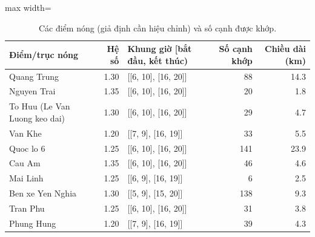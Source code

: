 \begin{table}[!htbp]
\centering
\small
\caption{Các điểm nóng (giả định cần hiệu chỉnh) và số cạnh được khớp.}
\label{tab:tab_hotspots}
\begin{adjustbox}{max width=\linewidth}
\begin{tabular}{lrlrr}
\toprule
Điểm/trục nóng & Hệ số & Khung giờ [bắt đầu, kết thúc) & Số cạnh khớp & Chiều dài (km) \\
\midrule
Quang Trung & 1.30 & [[6, 10], [16, 20]] & 88 & 14.3 \\
Nguyen Trai & 1.35 & [[6, 10], [16, 20]] & 20 & 1.8 \\
To Huu (Le Van Luong keo dai) & 1.30 & [[6, 10], [16, 20]] & 29 & 4.7 \\
Van Khe & 1.20 & [[7, 9], [16, 19]] & 33 & 5.5 \\
Quoc lo 6 & 1.25 & [[6, 10], [16, 20]] & 141 & 23.9 \\
Cau Am & 1.35 & [[6, 10], [16, 20]] & 46 & 4.6 \\
Mai Linh & 1.25 & [[6, 9], [16, 19]] & 6 & 2.5 \\
Ben xe Yen Nghia & 1.30 & [[5, 9], [15, 20]] & 138 & 9.3 \\
Tran Phu & 1.25 & [[6, 10], [16, 20]] & 31 & 3.8 \\
Phung Hung & 1.20 & [[7, 9], [16, 19]] & 39 & 4.3 \\
\bottomrule
\end{tabular}
\end{adjustbox}
\end{table}
